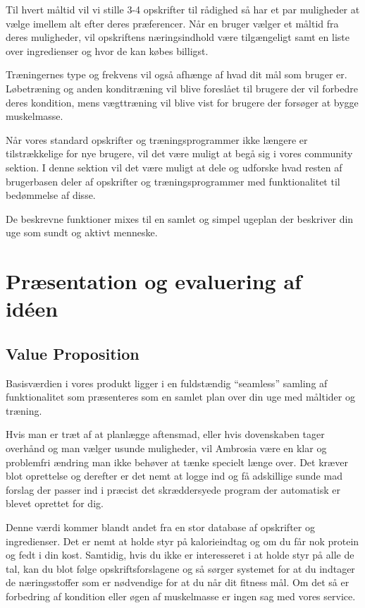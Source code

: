 \documentclass[a4paper,]{article}
\begin{document}
Til hvert måltid vil vi stille 3-4 opskrifter til rådighed så har et par muligheder at vælge imellem alt efter deres præferencer. Når en bruger vælger et måltid fra deres muligheder, vil opskriftens næringsindhold være tilgængeligt samt en liste over ingredienser og hvor de kan købes billigst. 

Træningernes type og frekvens vil også afhænge af hvad dit mål som bruger er. Løbetræning og anden konditræning vil blive foreslået til brugere der vil forbedre deres kondition, mens vægttræning vil blive vist for brugere der forsøger at bygge muskelmasse. 

Når vores standard opskrifter og træningsprogrammer ikke længere er tilstrækkelige for nye brugere, vil det være muligt at begå sig i vores community sektion. I denne sektion vil det være muligt at dele og udforske hvad resten af brugerbasen deler af opskrifter og træningsprogrammer med funktionalitet til bedømmelse af disse. 

De beskrevne funktioner mixes til en samlet og simpel ugeplan der beskriver din uge som sundt og aktivt menneske.

\newpage
\section{Præsentation og evaluering af idéen}

\subsection{Value Proposition}
Basisværdien i vores produkt ligger i en fuldstændig “seamless” samling af funktionalitet som præsenteres som en samlet plan over din uge med måltider og træning. 

Hvis man er træt af at planlægge aftensmad, eller hvis dovenskaben tager overhånd og man vælger usunde muligheder, vil Ambrosia være en klar og problemfri ændring man ikke behøver at tænke specielt længe over. Det kræver blot oprettelse og derefter er det nemt at logge ind og få adskillige sunde mad forslag der passer ind i præcist det skræddersyede program der automatisk er blevet oprettet for dig. 

Denne værdi kommer blandt andet fra en stor database af opskrifter og ingredienser. Det er nemt at holde styr på kalorieindtag og om du får nok protein og fedt i din kost. Samtidig, hvis du ikke er interesseret i at holde styr på alle de tal, kan du blot følge opskriftsforslagene og så sørger systemet for at du indtager de næringsstoffer som er nødvendige for at du når dit fitness mål. Om det så er forbedring af kondition eller øgen af muskelmasse er ingen sag med vores service. 
\end{document}
